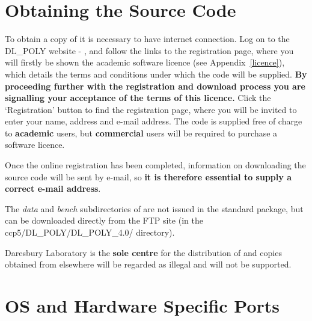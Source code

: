 \section{Obtaining the Source Code}
\label{distribution}  

To obtain a copy of \D it is necessary to have internet connection.
Log on to the DL\_POLY website - \WEB{}, and follow the
links to the \D registration page, where you will firstly be shown the
\D academic software licence (see Appendix~\ref{licence}), which details
the terms and conditions under which the code will be supplied.  {\bf By
proceeding further with the registration and download process you
are signalling your acceptance of the terms of this licence.}  Click
the `Registration' button to find the registration page, where you
will be invited to enter your name, address and e-mail address.  The
code is supplied free of charge to {\bf academic} users, but
{\bf commercial} users will be required to purchase a software licence.

Once the online registration has been completed, information
on downloading the \D source code will be sent by e-mail, so {\bf
it is therefore essential to supply a correct e-mail address}.

The {\em data} and {\em bench} subdirectories of \D are not issued
in the standard package, but can be downloaded directly from the
FTP site (in the \mbox{ccp5/DL\_POLY/DL\_POLY\_4.0/} directory).

 Daresbury Laboratory is the {\bf sole centre} for
the distribution of \D and copies obtained from elsewhere will be
regarded as illegal and will not be supported.

\section{OS and Hardware Specific Ports}
%
%

